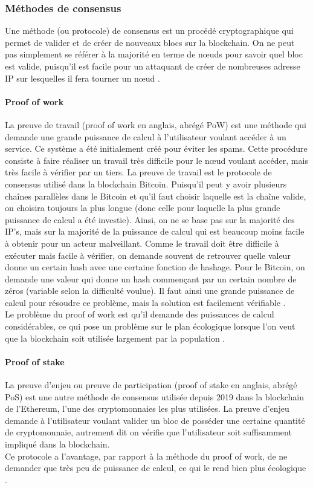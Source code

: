 \documentclass[10pt,a4paper,twoside]{article}
\numberwithin{equation}{section}
\begin{document}
		\subsubsection{Méthodes de consensus} \label{consensus}
			Une méthode (ou protocole) de consensus est un procédé cryptographique qui permet de valider et de créer de nouveaux blocs sur la blockchain. On ne peut pas simplement se référer à la majorité en terme de n\oe uds pour savoir quel bloc est valide, puisqu'il est facile pour un attaquant de créer de nombreuses adresse IP sur lesquelles il fera tourner un n\oe ud \cite{bitcoin}.
			
			\paragraph{Proof of work} \label{PoW}
				La preuve de travail (proof of work en anglais, abrégé PoW) est une méthode qui demande une grande puissance de calcul à l'utilisateur voulant accéder à un service. Ce système a été initialement créé pour éviter les spams. Cette procédure consiste à faire réaliser un travail très difficile pour le n\oe ud voulant accéder, mais très facile à vérifier par un tiers. La preuve de travail est le protocole de consensus utilisé dans la blockchain Bitcoin. Puisqu'il peut y avoir plusieurs chaînes parallèles dans le Bitcoin et qu'il faut choisir laquelle est la chaîne valide, on choisira toujours la plus longue (donc celle pour laquelle la plus grande puissance de calcul a été investie). Ainsi, on ne se base pas sur la majorité des IP's, mais sur la majorité de la puissance de calcul qui est beaucoup moins facile à obtenir pour un acteur malveillant. Comme le travail doit être difficile à exécuter mais facile à vérifier, on demande souvent de retrouver quelle valeur donne un certain hash avec une certaine fonction de hashage. Pour le Bitcoin, on demande une valeur qui donne un hash commençant par un certain nombre de zéros (variable selon la difficulté voulue). Il faut ainsi une grande puissance de calcul pour résoudre ce problème, mais la solution est facilement vérifiable \cite{bitcoin}.\\
				Le problème du proof of work est qu'il demande des puissances de calcul considérables, ce qui pose un problème sur le plan écologique lorsque l'on veut que la blockchain soit utilisée largement par la population \cite{wiki:PoW}.
			\paragraph{Proof of stake} \label{PoS}
				La preuve d'enjeu ou preuve de participation (proof of stake en anglais, abrégé PoS) est une autre méthode de consensus utilisée depuis 2019 dans la blockchain de l'Ethereum, l'une des cryptomonnaies les plus utilisées. La preuve d'enjeu demande à l'utilisateur voulant valider un bloc de posséder une certaine quantité de cryptomonnaie, autrement dit on vérifie que l'utilisateur soit suffisamment impliqué dans la blockchain.\\
				Ce protocole a l'avantage, par rapport à la méthode du proof of work, de ne demander que très peu de puissance de calcul, ce qui le rend bien plus écologique \cite{wiki:PoS}.
				
\end{document}
